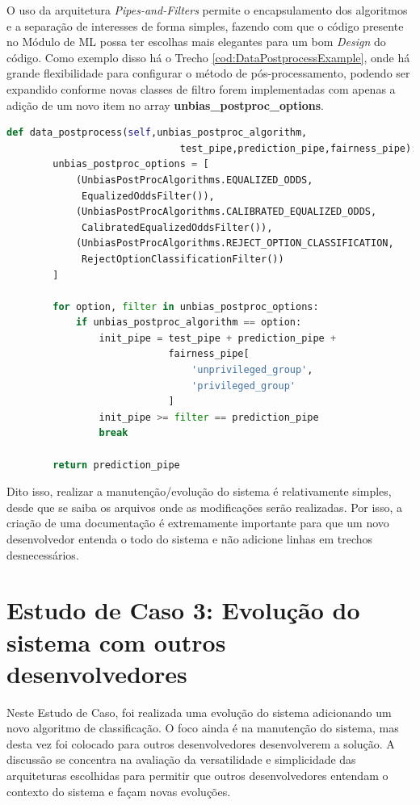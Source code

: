 \documentclass[portugues]{ic-tese}
\begin{document}
O uso da arquitetura \textit{Pipes-and-Filters} permite o encapsulamento dos algoritmos e a separação de interesses de forma simples, fazendo com que o código presente no Módulo de ML possa ter escolhas mais elegantes para um bom \textit{Design} do código. Como exemplo disso há o Trecho \ref{cod:DataPostprocessExample}, onde há grande flexibilidade para configurar o método de pós-processamento, podendo ser expandido conforme novas classes de filtro forem implementadas com apenas a adição de um novo item no array \textbf{unbias\_postproc\_options}.

\begin{lstlisting}[language=Python, caption=Método para seleção de algoritmo para redução de viés de pós-processamento,label=cod:DataPostprocessExample]
    def data_postprocess(self,unbias_postproc_algorithm,
    						  test_pipe,prediction_pipe,fairness_pipe):
        unbias_postproc_options = [
            (UnbiasPostProcAlgorithms.EQUALIZED_ODDS,
             EqualizedOddsFilter()),
            (UnbiasPostProcAlgorithms.CALIBRATED_EQUALIZED_ODDS,
             CalibratedEqualizedOddsFilter()),
            (UnbiasPostProcAlgorithms.REJECT_OPTION_CLASSIFICATION,
             RejectOptionClassificationFilter())
        ]

        for option, filter in unbias_postproc_options:
            if unbias_postproc_algorithm == option:
                init_pipe = test_pipe + prediction_pipe +
                			fairness_pipe[
    	            			'unprivileged_group',
	                			'privileged_group'
                			]
                init_pipe >= filter == prediction_pipe
                break

        return prediction_pipe
\end{lstlisting}

Dito isso, realizar a manutenção/evolução do sistema é relativamente simples, desde que se saiba os arquivos onde as modificações serão realizadas. Por isso, a criação de uma documentação é extremamente importante para que um novo desenvolvedor entenda o todo do sistema e não adicione linhas em trechos desnecessários.

\chapter{Estudo de Caso 3: Evolução do sistema com outros desenvolvedores}

Neste Estudo de Caso, foi realizada uma evolução do sistema adicionando um novo algoritmo de classificação. O foco ainda é na manutenção do sistema, mas desta vez foi colocado para outros desenvolvedores desenvolverem a solução. A discussão se concentra na avaliação da versatilidade e simplicidade das arquiteturas escolhidas para permitir que outros desenvolvedores entendam o contexto do sistema e façam novas evoluções.
\end{document}
